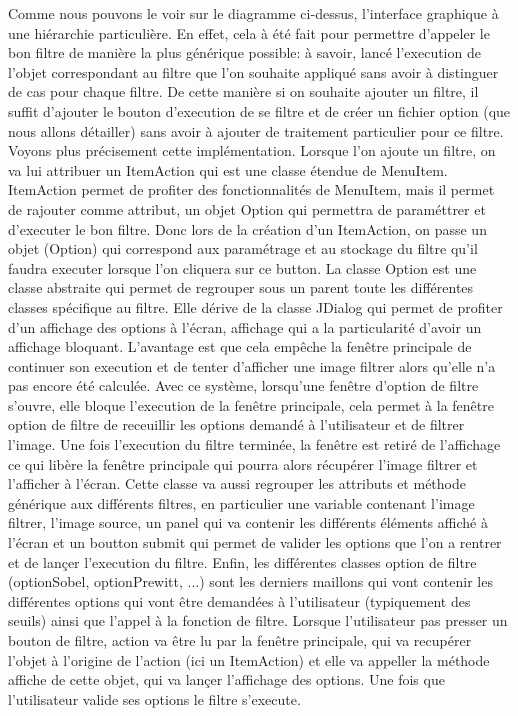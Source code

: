 \documentclass[twoside,openright,a4paper,11pt,french]{article}
\begin{document}
Comme nous pouvons le voir sur le diagramme ci-dessus, l'interface graphique à une hiérarchie
particulière. En effet, cela à été fait pour permettre d'appeler le bon filtre de manière la
plus générique possible: à savoir, lancé l'execution de l'objet correspondant au filtre que l'on
souhaite appliqué sans avoir à distinguer de cas pour chaque filtre.
De cette manière si on souhaite ajouter un filtre, il suffit d'ajouter le bouton d'execution de
se filtre et de créer un fichier option (que nous allons détailler) sans avoir à ajouter de traitement
particulier pour ce filtre. Voyons plus précisement cette implémentation.
Lorsque l'on ajoute un filtre, on va lui attribuer un ItemAction qui est une classe étendue de MenuItem.
ItemAction permet de profiter des fonctionnalités de MenuItem, mais il permet de rajouter comme attribut,
un objet Option qui permettra de paraméttrer et d'executer le bon filtre. Donc lors de la création d'un
ItemAction, on passe un objet (Option) qui correspond aux paramétrage et au stockage du filtre qu'il faudra
executer lorsque l'on cliquera sur ce button.
La classe Option est une classe abstraite qui permet de regrouper sous un parent toute les différentes classes
spécifique au filtre. Elle dérive de la classe JDialog qui permet de profiter d'un affichage des options à
l'écran, affichage qui a la particularité d'avoir un affichage bloquant. L'avantage est que cela empêche la
fenêtre principale de continuer son execution et de tenter d'afficher une image filtrer alors qu'elle n'a pas
encore été calculée. Avec ce système, lorsqu'une fenêtre d'option de filtre s'ouvre, elle bloque l'execution
de la fenêtre principale, cela permet à la fenêtre option de filtre de receuillir les options demandé à
l'utilisateur et de filtrer l'image. Une fois l'execution du filtre terminée, la fenêtre est retiré de l'affichage
ce qui libère la fenêtre principale qui pourra alors récupérer l'image filtrer et l'afficher à l'écran.
Cette classe va aussi regrouper les attributs et méthode générique aux différents filtres, en particulier une
variable contenant l'image filtrer, l'image source, un panel qui va contenir les différents
éléments affiché à l'écran et un boutton submit qui permet de valider
les options que l'on a rentrer et de lançer l'execution du filtre.
Enfin, les différentes classes option de filtre (optionSobel, optionPrewitt, ...) sont les derniers maillons qui
vont contenir les différentes options qui vont être demandées à l'utilisateur (typiquement des seuils) ainsi que
l'appel à la fonction de filtre.
Lorsque l'utilisateur pas presser un bouton de filtre, action va être lu par la fenêtre principale, qui va recupérer l'objet 
à l'origine de l'action (ici un ItemAction) et elle va appeller la méthode affiche de cette objet, qui va lançer l'affichage
des options. Une fois que l'utilisateur valide ses options le filtre s'execute.
\end{document}
